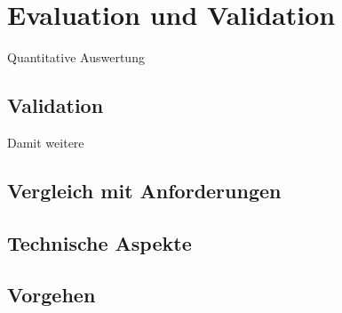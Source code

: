 \chapter{Evaluation und Validation}
\label{ch:Eval}


Quantitative Auswertung

\section{Validation}

Damit weitere 


\section{Vergleich mit Anforderungen}
\label{sec:VergleichAnforderungen}

\seereq{}



\section{Technische Aspekte}

\section{Vorgehen}
